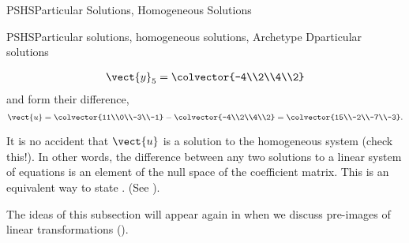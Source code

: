 \begin{subsect}{PSHS}{Particular Solutions, Homogeneous Solutions}
\begin{example}{PSHS}{Particular solutions, homogeneous solutions, Archetype D}{particular solutions}
\begin{para}
\begin{align*}
\vect{y}_5=\colvector{-4\\2\\4\\2}
\end{align*}
%
and form their difference,
%
\begin{equation*}
\vect{u}=\colvector{11\\0\\-3\\-1}-\colvector{-4\\2\\4\\2}=\colvector{15\\-2\\-7\\-3}.
\end{equation*}\end{para}
%
\begin{para}It is no accident that $\vect{u}$ is a solution to the homogeneous system (check this!).  In other words, the difference between any two solutions to a linear system of equations is an element of the null space of the coefficient matrix.  This is an equivalent way to state .   (See ).\end{para}
\end{example}
%
\begin{para}The ideas of this subsection will appear again in  when we discuss pre-images of linear transformations ().\end{para}
%
%
\end{subsect}
%

